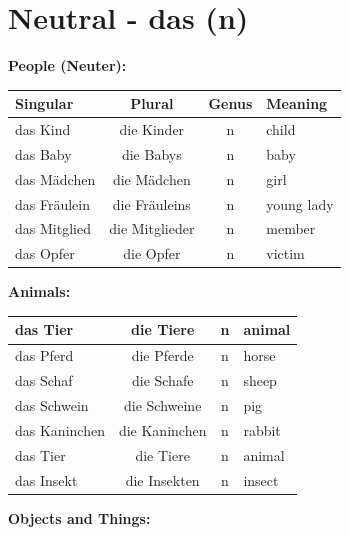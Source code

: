 \section{Neutral - das (n)}
\label{sec:NeutralNomen}

\bigskip
\noindent\textbf{People (Neuter):}

\begin{center}
\begin{tabular}{|l|c|c|l|}
\hline
Singular & Plural & Genus & Meaning \\ \hline
das Kind & die Kinder & n & child \\ \hline
das Baby & die Babys & n & baby \\ \hline
das Mädchen & die Mädchen & n & girl \\ \hline
das Fräulein & die Fräuleins & n & young lady \\ \hline
das Mitglied & die Mitglieder & n & member \\ \hline
das Opfer & die Opfer & n & victim \\ \hline
\end{tabular}
\end{center}

\bigskip
\noindent\textbf{Animals:}

\begin{center}
\begin{tabular}{|l|c|c|l|}
\hline
das Tier & die Tiere & n & animal \\ \hline
das Pferd & die Pferde & n & horse \\ \hline
das Schaf & die Schafe & n & sheep \\ \hline
das Schwein & die Schweine & n & pig \\ \hline
das Kaninchen & die Kaninchen & n & rabbit \\ \hline
das Tier & die Tiere & n & animal \\ \hline
das Insekt & die Insekten & n & insect \\ \hline
\end{tabular}
\end{center}

\bigskip
\noindent\textbf{Objects and Things:}

